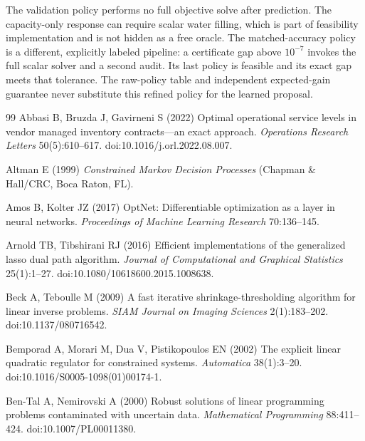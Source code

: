 \documentclass[11pt,letterpaper]{article}
\theoremstyle{definition}
\newcommand{\1}{\mathbf 1}
\begin{document}
The validation policy performs no full objective solve after prediction. The capacity-only response can require scalar water filling, which is part of feasibility implementation and is not hidden as a free oracle. The matched-accuracy policy is a different, explicitly labeled pipeline: a certificate gap above $10^{-7}$ invokes the full scalar solver and a second audit. Its last policy is feasible and its exact gap meets that tolerance. The raw-policy table and independent expected-gain guarantee never substitute this refined policy for the learned proposal.


\clearpage

\begin{thebibliography}{99}
Abbasi B, Bruzda J, Gavirneni S (2022) Optimal operational service levels in vendor managed inventory contracts---an exact approach. \emph{Operations Research Letters} 50(5):610--617. doi:10.1016/j.orl.2022.08.007.

Altman E (1999) \emph{Constrained Markov Decision Processes} (Chapman \& Hall/CRC, Boca Raton, FL).

Amos B, Kolter JZ (2017) OptNet: Differentiable optimization as a layer in neural networks. \emph{Proceedings of Machine Learning Research} 70:136--145.

Arnold TB, Tibshirani RJ (2016) Efficient implementations of the generalized lasso dual path algorithm. \emph{Journal of Computational and Graphical Statistics} 25(1):1--27. doi:10.1080/10618600.2015.1008638.

Beck A, Teboulle M (2009) A fast iterative shrinkage-thresholding algorithm for linear inverse problems. \emph{SIAM Journal on Imaging Sciences} 2(1):183--202. doi:10.1137/080716542.

Bemporad A, Morari M, Dua V, Pistikopoulos EN (2002) The explicit linear quadratic regulator for constrained systems. \emph{Automatica} 38(1):3--20. doi:10.1016/S0005-1098(01)00174-1.

Ben-Tal A, Nemirovski A (2000) Robust solutions of linear programming problems contaminated with uncertain data. \emph{Mathematical Programming} 88:411--424. doi:10.1007/PL00011380.


\end{thebibliography}
\end{document}
